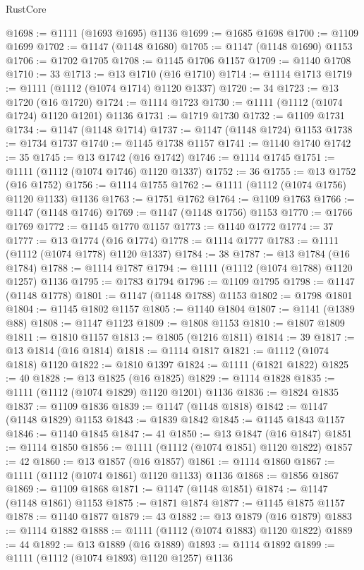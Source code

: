 \begin{lexlean}{RustCore}
\begin{coremodule}
@1698 := @1111 (@1693 @1695) @1136
@1699 := @1685 @1698
@1700 := @1109 @1699
@1702 := @1147 (@1148 @1680)
@1705 := @1147 (@1148 @1690) @1153
@1706 := @1702 @1705
@1708 := @1145 @1706 @1157
@1709 := @1140 @1708
@1710 := 33
@1713 := @13 @1710 (@16 @1710)
@1714 := @1114 @1713
@1719 := @1111 (@1112 (@1074 @1714) @1120 @1337)
@1720 := 34
@1723 := @13 @1720 (@16 @1720)
@1724 := @1114 @1723
@1730 := @1111 (@1112 (@1074 @1724) @1120 @1201) @1136
@1731 := @1719 @1730
@1732 := @1109 @1731
@1734 := @1147 (@1148 @1714)
@1737 := @1147 (@1148 @1724) @1153
@1738 := @1734 @1737
@1740 := @1145 @1738 @1157
@1741 := @1140 @1740
@1742 := 35
@1745 := @13 @1742 (@16 @1742)
@1746 := @1114 @1745
@1751 := @1111 (@1112 (@1074 @1746) @1120 @1337)
@1752 := 36
@1755 := @13 @1752 (@16 @1752)
@1756 := @1114 @1755
@1762 := @1111 (@1112 (@1074 @1756) @1120 @1133) @1136
@1763 := @1751 @1762
@1764 := @1109 @1763
@1766 := @1147 (@1148 @1746)
@1769 := @1147 (@1148 @1756) @1153
@1770 := @1766 @1769
@1772 := @1145 @1770 @1157
@1773 := @1140 @1772
@1774 := 37
@1777 := @13 @1774 (@16 @1774)
@1778 := @1114 @1777
@1783 := @1111 (@1112 (@1074 @1778) @1120 @1337)
@1784 := 38
@1787 := @13 @1784 (@16 @1784)
@1788 := @1114 @1787
@1794 := @1111 (@1112 (@1074 @1788) @1120 @1257) @1136
@1795 := @1783 @1794
@1796 := @1109 @1795
@1798 := @1147 (@1148 @1778)
@1801 := @1147 (@1148 @1788) @1153
@1802 := @1798 @1801
@1804 := @1145 @1802 @1157
@1805 := @1140 @1804
@1807 := @1141 (@1389 @88)
@1808 := @1147 @1123
@1809 := @1808 @1153
@1810 := @1807 @1809
@1811 := @1810 @1157
@1813 := @1805 (@1216 @1811)
@1814 := 39
@1817 := @13 @1814 (@16 @1814)
@1818 := @1114 @1817
@1821 := @1112 (@1074 @1818) @1120
@1822 := @1810 @1397
@1824 := @1111 (@1821 @1822)
@1825 := 40
@1828 := @13 @1825 (@16 @1825)
@1829 := @1114 @1828
@1835 := @1111 (@1112 (@1074 @1829) @1120 @1201) @1136
@1836 := @1824 @1835
@1837 := @1109 @1836
@1839 := @1147 (@1148 @1818)
@1842 := @1147 (@1148 @1829) @1153
@1843 := @1839 @1842
@1845 := @1145 @1843 @1157
@1846 := @1140 @1845
@1847 := 41
@1850 := @13 @1847 (@16 @1847)
@1851 := @1114 @1850
@1856 := @1111 (@1112 (@1074 @1851) @1120 @1822)
@1857 := 42
@1860 := @13 @1857 (@16 @1857)
@1861 := @1114 @1860
@1867 := @1111 (@1112 (@1074 @1861) @1120 @1133) @1136
@1868 := @1856 @1867
@1869 := @1109 @1868
@1871 := @1147 (@1148 @1851)
@1874 := @1147 (@1148 @1861) @1153
@1875 := @1871 @1874
@1877 := @1145 @1875 @1157
@1878 := @1140 @1877
@1879 := 43
@1882 := @13 @1879 (@16 @1879)
@1883 := @1114 @1882
@1888 := @1111 (@1112 (@1074 @1883) @1120 @1822)
@1889 := 44
@1892 := @13 @1889 (@16 @1889)
@1893 := @1114 @1892
@1899 := @1111 (@1112 (@1074 @1893) @1120 @1257) @1136

\end{coremodule}
\end{lexlean}
